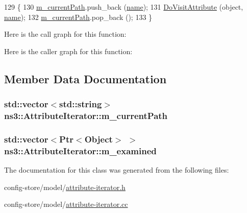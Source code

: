 \begin{DoxyCode}
129 \{
130   \hyperlink{classns3_1_1AttributeIterator_a16b23ebf1883a063cd7ec759148d83a9}{m\_currentPath}.push\_back (\hyperlink{generate__test__data__lte__spectrum__model_8m_ab74e6bf80237ddc4109968cedc58c151}{name});
131   \hyperlink{classns3_1_1AttributeIterator_a6e4a614634b16fbdddd1d472928b5c12}{DoVisitAttribute} (\textcolor{keywordtype}{object}, \hyperlink{generate__test__data__lte__spectrum__model_8m_ab74e6bf80237ddc4109968cedc58c151}{name});
132   \hyperlink{classns3_1_1AttributeIterator_a16b23ebf1883a063cd7ec759148d83a9}{m\_currentPath}.pop\_back ();
133 \}
\end{DoxyCode}


Here is the call graph for this function\+:




Here is the caller graph for this function\+:




\subsection{Member Data Documentation}
\subsubsection[{\texorpdfstring{m\+\_\+current\+Path}{m_currentPath}}]{\setlength{\rightskip}{0pt plus 5cm}std\+::vector$<$std\+::string$>$ ns3\+::\+Attribute\+Iterator\+::m\+\_\+current\+Path\hspace{0.3cm}{\ttfamily [private]}}\hypertarget{classns3_1_1AttributeIterator_a16b23ebf1883a063cd7ec759148d83a9}{}\label{classns3_1_1AttributeIterator_a16b23ebf1883a063cd7ec759148d83a9}
\subsubsection[{\texorpdfstring{m\+\_\+examined}{m_examined}}]{\setlength{\rightskip}{0pt plus 5cm}std\+::vector$<${\bf Ptr}$<${\bf Object}$>$ $>$ ns3\+::\+Attribute\+Iterator\+::m\+\_\+examined\hspace{0.3cm}{\ttfamily [private]}}\hypertarget{classns3_1_1AttributeIterator_ab43bac2d9c3ddcc7aa92ab5b727741dc}{}\label{classns3_1_1AttributeIterator_ab43bac2d9c3ddcc7aa92ab5b727741dc}


The documentation for this class was generated from the following files\+:\begin{DoxyCompactItemize}
\item 
config-\/store/model/\hyperlink{attribute-iterator_8h}{attribute-\/iterator.\+h}\item 
config-\/store/model/\hyperlink{attribute-iterator_8cc}{attribute-\/iterator.\+cc}\end{DoxyCompactItemize}
